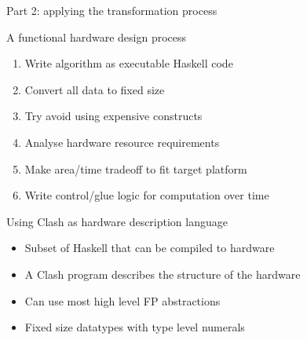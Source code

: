 \documentclass[pdf]{beamer}
\begin{document}
\begin{frame}{Part 2: applying the transformation process}

\begin{block}{A functional hardware design process}
\begin{enumerate}
\item Write algorithm as executable Haskell code
\item Convert all data to fixed size
\item Try avoid using expensive constructs %
\item Analyse hardware resource requirements
\item Make area/time tradeoff to fit target platform
\item \alert{Write control/glue logic for computation over time}
\end{enumerate}
\end{block}

\begin{block}{Using Clash as hardware description language}
\begin{itemize}
\item Subset of Haskell that can be compiled to hardware
\item A Clash program describes the structure of the hardware
\item Can use most high level FP abstractions %
\item Fixed size datatypes with type level numerals
\end{itemize}
\end{block}

\end{frame}

\end{document}
